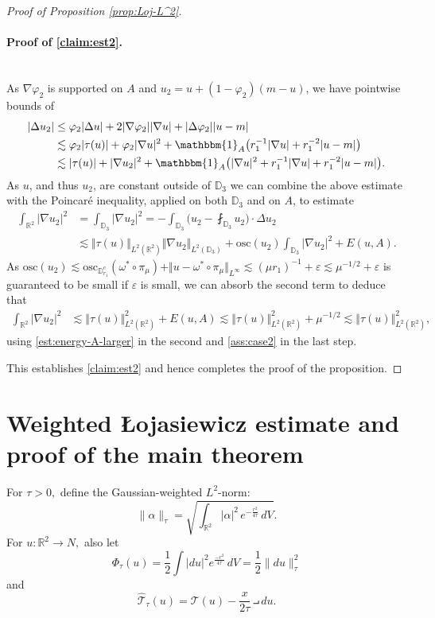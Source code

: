 \documentclass[10pt,reqno]{amsart}
\theoremstyle{plain}
\theoremstyle{definition}
\numberwithin{equation}{section}
\newcommand{\om}{\omega}
\newcommand{\D}{\mathbb{D}}
\newcommand{\R}{\ensuremath{{\mathbb R}}}
\newcommand{\osc}{\text{osc}}
\newcommand{\T}{{\mathcal T}}
\newcommand{\That}{{ \widehat{\T} }}
\newcommand{\norm}[1]{\Vert#1\Vert}
\newcommand{\beqas}{\begin{equation*}\begin{aligned}}
\newcommand{\eeqas}{\end{aligned}\end{equation*}}
\newcommand{\leqs}{\lesssim}
\newcommand{\abs}[1]{\vert#1\vert}
\newcommand{\eps}{\varepsilon}
\newcommand{\na}{\nabla}
\begin{document}
\begin{proof}[Proof of Proposition \ref{prop:Loj-L^2}]
\paragraph{\textbf{Proof of \eqref{claim:est2}.}}
$ $\\
As $\na \varphi_2$ is supported on $A$ and  $u_2=u+(1-\varphi_2)(m-u)$, we have
pointwise bounds of 
\beqas
|\Delta u_2|
&\leq\varphi_2
|\Delta u|+2
|\na\varphi_2||\na u|+
|\Delta\varphi_2||u-m|
\\
&\leqs
\varphi_2|\tau(u)|
+
\varphi_2|\na u|^2
+
\mathbbm{1}_A\bigl(r_1^{-1}|\na u|+r_1^{-2}|u-m|\bigr)\\
&\leqs
|\tau(u)|
+
|\na u_2|^2
+
\mathbbm{1}_A\bigl(|\na u|^2+r_1^{-1}|\na u|+r_1^{-2}|u-m|\bigr).
\eeqas
As $u$, and thus $u_2$, are constant outside of $\D_3$ we can combine the above estimate with the Poincar\'e inequality, applied on both $\D_3$ and on $A$, to estimate
\beqas
\int_{\R^2}|\na u_2|^2&=\int_{\D_3}|\na u_2|^2
=
-\int_{\D_3}
\bigl(u_2-\fint_{\D_3}u_2\bigr)\cdot\Delta u_2
\\
&\leqs
\norm{\tau(u)}_{L^2(\R^2)}
\norm{\na u_2}_{L^2(\D_3)}
+\osc(u_2) \int_{\D_3} \abs{\na u_2}^2+E(u,A).
\eeqas
As $\osc(u_2)\leqs
\osc_{\D_{r_1}^c}(\om^*\circ\pi_\mu)+\norm{u-\om^*\circ\pi_{\mu}}_{L^\infty}\leqs (\mu r_1)^{-1}+\eps\leqs \mu^{-1/2}+\eps$ is guaranteed to be small if $\eps$ is small, we can  absorb the second term 
to deduce that
\beqas
\int_{\R^2}|\na u_2|^2
&\leqs
\norm{\tau(u)}_{L^2(\R^2)}^2 
+
E(u,A)\leqs \norm{\tau(u)}_{L^2(\R^2)}^2 +\mu^{-1/2} \leqs\norm{\tau(u)}_{L^2(\R^2)}^2, 
\eeqas
using \eqref{est:energy-A-larger} in the second and 
\eqref{ass:case2} in the last step. 

This establishes \eqref{claim:est2} and hence completes the proof of the proposition.
\end{proof}


\section{Weighted \L ojasiewicz estimate and proof of the main theorem}
For $\tau > 0,$ define the Gaussian-weighted $L^2$-norm:
\begin{equation*}
\| \alpha \|_\tau = \sqrt{ \int_{\R^2} |\alpha |^2 \, e^{-\frac{r^2}{4\tau} } \, dV }.
\end{equation*}
For $u : \R^2 \to N,$ also let
$$\Phi_\tau(u) = \frac12 \int |du|^2 e^{ \frac{-r^2}{4 \tau} } \, dV = \frac12 \| du \|_{\tau}^2$$
and
$$\That_\tau(u) = \T(u) - \frac{x}{2 \tau} \intprod du.$$
\end{document}
